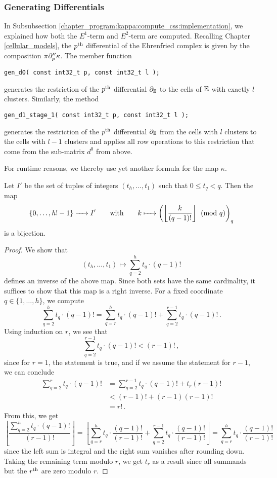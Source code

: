 \subsubsection{Generating Differentials}
\label{chapter_program:kappa:css:gen_diff}

In Subsubsection \ref{chapter_program:kappa:compute_css:implementation}, we explained how both the $E^1$-term and $E^2$-term are computed.
Recalling Chapter \ref{cellular_models}, the $p^{\text{th}}$ differential of the Ehrenfried complex is given by the composition $\pi \partial''_p \kappa$.
The member function
\begin{lstlisting}
gen_d0( const int32_t p, const int32_t l );
\end{lstlisting}
generates the restriction of the $p^{\text{th}}$ differential $\partial_\mathbb E$ to the cells of $\mathbb E$ with exactly $l$ clusters.
Similarly, the method
\begin{lstlisting}
gen_d1_stage_1( const int32_t p, const int32_t l );
\end{lstlisting}
generates the restriction of the $p^{\text{th}}$ differential $\partial_\mathbb E$ from the cells with $l$ clusters to the cells with $l-1$ clusters and
applies all row operations to this restriction that come from the sub-matrix $d^0$ from above.

For runtime reasons, we thereby use yet another formula for the map $\kappa$.
\begin{prop}
    Let $I'$ be the set of tuples of integers $(t_h, \ldots, t_1)$ such that $0 \leq t_q < q$.
    Then the map
    \[
        \{ 0, \ldots, h! - 1\} \to I'
        \mspc{with}{20}
        k \mapsto \left( \left\lfloor \frac{k}{(q-1)!} \right\rfloor \pmod q\right)_q
    \]
    is a bijection.
\end{prop}
\begin{proof}
We show that
\[
    (t_h, \ldots, t_1) \mapsto \sum_{q=2}^h t_q \cdot (q-1)!
\]
defines an inverse of the above map. 
Since both sets have the same cardinality, 
it suffices to show that this map is a right inverse.
For a fixed coordinate $q \in \{1, \dotsc, h\}$, we compute
\[
    \sum_{q=2}^h t_q \cdot (q-1)! = \sum_{q=r}^h t_q \cdot (q-1)! + \sum_{q=2}^{r-1} t_q \cdot (q-1)!\,.
\]
Using induction on $r$, we see that
\[
    \sum_{q=2}^{r-1} t_q \cdot (q-1)! < (r-1)!\,,
\]
since for $r = 1$, the statement is true, and if we assume the statement for $r-1$, we can conclude
\begin{align*}
    \sum_{q=2}^{r} t_q \cdot (q-1)! &= \sum_{q=2}^{r-1} t_q \cdot (q-1)! + t_r (r-1)! \\
                                    &< (r-1)!               + (r-1) (r-1)! \\
                                    &= r!\,.
\end{align*}
From this, we get
\[
    \left\lfloor \frac{\sum_{q=2}^h t_q \cdot (q-1)!}{(r-1)!} \right\rfloor=\left\lfloor \sum_{q=r}^h t_q \cdot \frac{(q-1)!}{(r-1)!} + \sum_{q=2}^{r-1} t_q \cdot \frac{(q-1)!}{(r-1)!} \right\rfloor = \sum_{q=r}^h t_q \cdot \frac{(q-1)!}{(r-1)!}
\]
since the left sum is integral and the right sum vanishes after rounding down.
Taking the remaining term modulo $r$, we get $t_r$ as a result since all summands but the $r^{\text{th}}$ are zero modulo $r$.
\end{proof}

